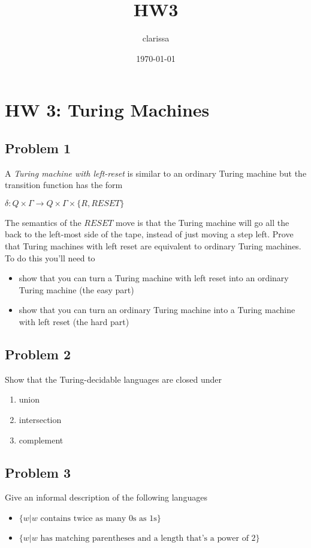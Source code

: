 \documentclass[11pt]{article}
\author{clarissa}
\date{\today}
\title{HW3}
\begin{document}
\maketitle
\tableofcontents

\section{HW 3: Turing Machines}
\label{sec-1}
\subsection{Problem 1}
\label{sec-1-1}
A \emph{Turing machine with left-reset} is similar to an ordinary Turing machine but the transition function has the form

$\delta : Q \times \Gamma \to Q \times \Gamma \times \{ R, RESET \}$

The semantics of the $RESET$ move is that the Turing machine will go all the back to the left-most side of the tape, instead of just moving a step left. Prove that Turing machines with left reset are equivalent to ordinary Turing machines. To do this you'll need to 

\begin{itemize}
\item show that you can turn a Turing machine with left reset into an ordinary Turing machine (the easy part)
\item show that you can turn an ordinary Turing machine into a Turing machine with left reset (the hard part)
\end{itemize}
\subsection{Problem 2}
\label{sec-1-2}
Show that the Turing-decidable languages are closed under

\begin{enumerate}
\item union
\item intersection
\item complement
\end{enumerate}

\subsection{Problem 3}
\label{sec-1-3}
Give an informal description of the following languages

\begin{itemize}
\item $\{ w | w \text{ contains twice as many 0s as 1s} \}$
\item $\{ w | w \text{ has matching parentheses and a length that's a power of 2}\}$
\end{itemize}
\end{document}
